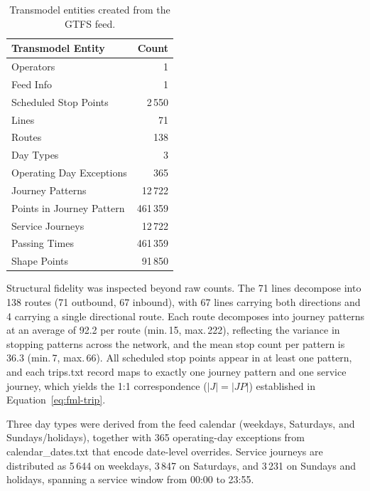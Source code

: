 \begin{table}[htbp]
  \centering
  \caption{Transmodel entities created from the GTFS feed.}
  \label{tab:import_results}
  \begin{tabular}{l r}
    \hline
    \textbf{Transmodel Entity} & \textbf{Count} \\
    \hline
    Operators                    & 1        \\
    Feed Info                    & 1        \\
    Scheduled Stop Points        & 2\,550   \\
    Lines                        & 71       \\
    Routes                       & 138      \\
    Day Types                    & 3        \\
    Operating Day Exceptions     & 365      \\
    Journey Patterns             & 12\,722  \\
    Points in Journey Pattern    & 461\,359 \\
    Service Journeys             & 12\,722  \\
    Passing Times                & 461\,359 \\
    Shape Points                 & 91\,850  \\
    \hline
  \end{tabular}
\end{table}
 
Structural fidelity was inspected beyond raw counts. The 71 lines decompose into
138 routes (71 outbound, 67 inbound), with 67 lines carrying both directions and 4
carrying a single directional route. Each route decomposes into journey patterns at an
average of 92.2 per route (min.\,15, max.\,222), reflecting the variance in
stopping patterns across the network, and the mean stop count per pattern is 36.3
(min.\,7, max.\,66). All scheduled stop points appear in at least one pattern, and
each trips.txt record maps to exactly one journey pattern and one service
journey, which yields the 1:1 correspondence
($\lvert J \rvert = \lvert \mathit{JP}\rvert$) established in
Equation~\eqref{eq:fml-trip}.
 
Three day types were derived from the feed calendar (weekdays, Saturdays, and
Sundays/holidays), together with 365 operating-day exceptions from
calendar\_dates.txt that encode date-level overrides. Service journeys
are distributed as 5\,644 on weekdays, 3\,847 on Saturdays, and 3\,231 on Sundays and
holidays, spanning a service window from 00:00 to 23:55.
 
